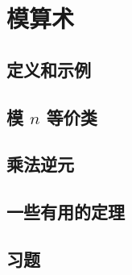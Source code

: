 \section{模算术}

\subsection{定义和示例}

\subsection{模 $n$ 等价类}

\subsection{乘法逆元}

\subsection{一些有用的定理}

\subsection{习题}